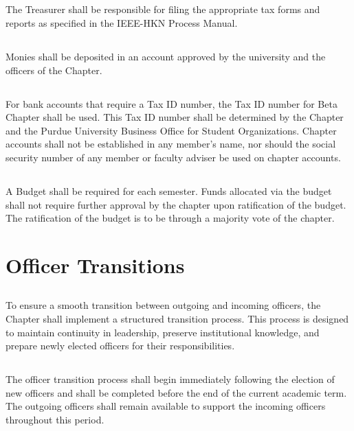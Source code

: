 \documentclass[10pt, oneside]{article}
\begin{document}
\subsection{}
The Treasurer shall be responsible for filing the appropriate tax forms and reports as specified in the IEEE-HKN Process Manual.

\subsection{}
Monies shall be deposited in an account approved by the university and the officers of the Chapter.

\subsection{}
For bank accounts that require a Tax ID number, the Tax ID number for Beta Chapter shall be used. This Tax ID number shall be determined by the Chapter and the Purdue University Business Office for Student Organizations. Chapter accounts shall not be established in any member’s name, nor should the social security number of any member or faculty adviser be used on chapter accounts.

\subsection{}
A Budget shall be required for each semester. Funds allocated via the budget shall not require further approval by the chapter upon ratification of the budget. The ratification of the budget is to be through a majority vote of the chapter.

\section{Officer Transitions}
\subsection{}
To ensure a smooth transition between outgoing and incoming officers, the Chapter shall implement a structured transition process. This process is designed to maintain continuity in leadership, preserve institutional knowledge, and prepare newly elected officers for their responsibilities.

\subsection{}
The officer transition process shall begin immediately following the election of new officers and shall be completed before the end of the current academic term. The outgoing officers shall remain available to support the incoming officers throughout this period.
\end{document}
